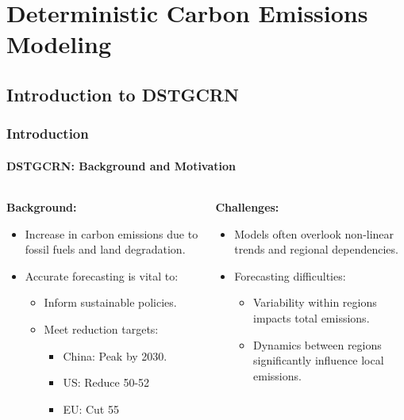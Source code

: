 \documentclass[light]{lutbeamer} %
\begin{document}

\section{Deterministic Carbon Emissions Modeling}
\subsection{Introduction to DSTGCRN}
\begin{frame}
    \frametitle{Introduction}
    \framesubtitle{DSTGCRN: Background and Motivation}
    \begin{columns}[T]
        \begin{column}{0.45\textwidth}
            \textbf{Background:}
            \begin{itemize}
                \item Increase in carbon emissions due to fossil fuels and land degradation.
                \item Accurate forecasting is vital to:
                      \begin{itemize}
                          \item Inform sustainable policies.
                          \item Meet reduction targets:
                                \begin{itemize}
                                    \item China: Peak by 2030.
                                    \item US: Reduce 50-52%
                                    \item EU: Cut 55%
                                \end{itemize}
                      \end{itemize}
            \end{itemize}
        \end{column}
        \begin{column}{0.45\textwidth}
            \textbf{Challenges:}
            \begin{itemize}
                \item Models often overlook non-linear trends and regional dependencies.
                \item Forecasting difficulties:
                      \begin{itemize}
                          \item Variability within regions impacts total emissions.
                          \item Dynamics between regions significantly influence local emissions.
                      \end{itemize}
            \end{itemize}
        \end{column}
    \end{columns}
\end{frame}
\end{document}
